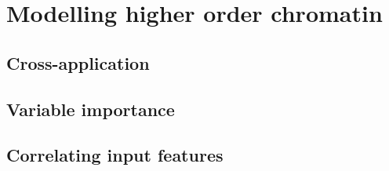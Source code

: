 \documentclass[a4paper,11pt,oneside]{book}
\begin{document}
\section{Modelling higher order chromatin}

\subsection{Cross-application}

\subsection{Variable importance}

\subsection{Correlating input features}

\ifstandalone
\begin{small}

\end{small}
\fi
\end{document}
